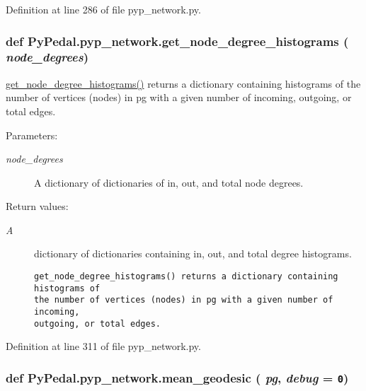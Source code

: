 Definition at line 286 of file pyp\_\-network.py.\hypertarget{namespacePyPedal_1_1pyp__network_7abe5f06621472c95b183cc8fd521cc4}{
\subsubsection[get\_\-node\_\-degree\_\-histograms]{\setlength{\rightskip}{0pt plus 5cm}def Py\-Pedal.pyp\_\-network.get\_\-node\_\-degree\_\-histograms ( {\em node\_\-degrees})}}
\label{namespacePyPedal_1_1pyp__network_7abe5f06621472c95b183cc8fd521cc4}


\hyperlink{namespacePyPedal_1_1pyp__network_7abe5f06621472c95b183cc8fd521cc4}{get\_\-node\_\-degree\_\-histograms()} returns a dictionary containing histograms of the number of vertices (nodes) in pg with a given number of incoming, outgoing, or total edges. 

\begin{Desc}
\item[Parameters:]
\begin{description}
\item[{\em node\_\-degrees}]A dictionary of dictionaries of in, out, and total node degrees. \end{description}
\end{Desc}
\begin{Desc}
\item[Return values:]
\begin{description}
\item[{\em A}]dictionary of dictionaries containing in, out, and total degree histograms.

\footnotesize\begin{verbatim}get_node_degree_histograms() returns a dictionary containing histograms of
the number of vertices (nodes) in pg with a given number of incoming,
outgoing, or total edges.
\end{verbatim}
\normalsize
 \end{description}
\end{Desc}


Definition at line 311 of file pyp\_\-network.py.\hypertarget{namespacePyPedal_1_1pyp__network_7c69193d5911cfb1deb21a6bd45a9423}{
\subsubsection[mean\_\-geodesic]{\setlength{\rightskip}{0pt plus 5cm}def Py\-Pedal.pyp\_\-network.mean\_\-geodesic ( {\em pg},  {\em debug} = {\tt 0})}}
\label{namespacePyPedal_1_1pyp__network_7c69193d5911cfb1deb21a6bd45a9423}



